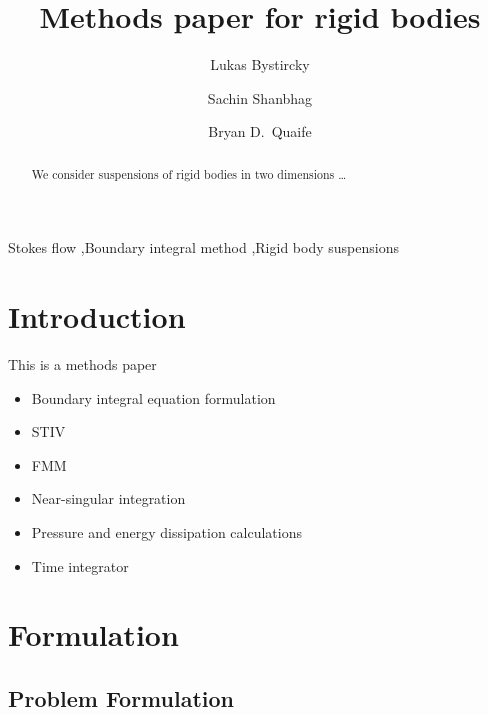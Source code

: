 \documentclass[preprint, 10pt]{elsarticle}
\begin{document}
\title{Methods paper for rigid bodies}

\author[Lukas]{Lukas Bystircky}
\author[Lukas]{Sachin Shanbhag}
\author[Bryan]{Bryan D.~Quaife}
\address[Lukas]{Department of Scientific Computing, Florida State University,
Tallahassee, FL, 32306.}
\address[Bryan]{Department of Scientific Computing and Geophysical Fluid
Dynamics Institute, Florida State University, Tallahassee, FL, 32306.}

\begin{abstract} 
We consider suspensions of rigid bodies in two dimensions \ldots
\end{abstract}

\begin{keyword}
  Stokes flow \sep Boundary integral method \sep Rigid body suspensions 
\end{keyword}

\maketitle





\section{Introduction\label{s:intro}}


This is a methods paper
\begin{itemize}
  \item Boundary integral equation formulation
  \item STIV
  \item FMM
  \item Near-singular integration
  \item Pressure and energy dissipation calculations
  \item Time integrator
\end{itemize}




\section{Formulation\label{s:formulation}} 
\subsection{Problem Formulation}
\end{document}
